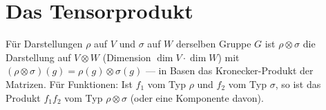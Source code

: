 \section{Das Tensorprodukt}

\begin{definition}
Für Darstellungen $\rho$ auf $V$ und $\sigma$ auf $W$ derselben Gruppe $G$ ist $\rho\otimes\sigma$ die Darstellung auf $V\otimes W$ (Dimension $\dim V\cdot\dim W$) mit $(\rho\otimes\sigma)(g) = \rho(g)\otimes\sigma(g)$ --- in Basen das Kronecker-Produkt der Matrizen. Für Funktionen: Ist $f_1$ vom Typ $\rho$ und $f_2$ vom Typ $\sigma$, so ist das Produkt $f_1f_2$ vom Typ $\rho\otimes\sigma$ (oder eine Komponente davon).
\end{definition}

